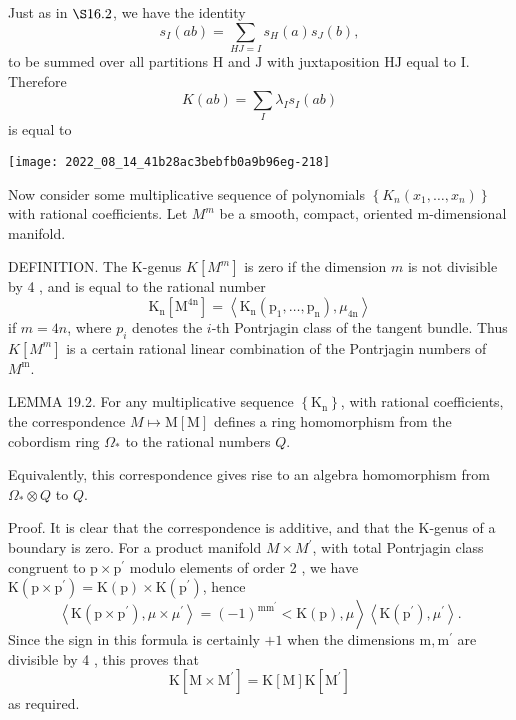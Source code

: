 \documentclass[10pt]{article}
\begin{document}
Just as in $\S 16.2$, we have the identity
$$
s_{I}(a b)=\sum_{H J=I} s_{H}(a) s_{J}(b),
$$
to be summed over all partitions $\mathrm{H}$ and $\mathrm{J}$ with juxtaposition $\mathrm{HJ}$ equal to I. Therefore
$$
K(a b)=\sum_{I} \lambda_{I} s_{I}(a b)
$$
is equal to

\texttt{[image: 2022\_08\_14\_41b28ac3bebfb0a9b96eg-218]}

Now consider some multiplicative sequence of polynomials $\left\{K_{n}\left(x_{1}, \ldots, x_{n}\right)\right\}$ with rational coefficients. Let $M^{m}$ be a smooth, compact, oriented m-dimensional manifold.

DEFINITION. The K-genus $K\left[M^{m}\right]$ is zero if the dimension $m$ is not divisible by 4 , and is equal to the rational number
$$
\mathrm{K}_{\mathrm{n}}\left[\mathrm{M}^{4 \mathrm{n}}\right]=\left\langle\mathrm{K}_{\mathrm{n}}\left(\mathrm{p}_{1}, \ldots, \mathrm{p}_{\mathrm{n}}\right), \mu_{4 \mathrm{n}}\right\rangle
$$
if $m=4 n$, where $p_{i}$ denotes the $i$-th Pontrjagin class of the tangent bundle. Thus $K\left[M^{m}\right]$ is a certain rational linear combination of the Pontrjagin numbers of $M^{\mathrm{m}}$.

LEMMA 19.2. For any multiplicative sequence $\left\{\mathrm{K}_{\mathrm{n}}\right\}$, with rational coefficients, the correspondence $M \mapsto \mathrm{M}[\mathrm{M}]$ defines a ring homomorphism from the cobordism ring $\Omega_{*}$ to the rational numbers $Q .$

Equivalently, this correspondence gives rise to an algebra homomorphism from $\Omega_{*} \otimes Q$ to $Q$.

Proof. It is clear that the correspondence is additive, and that the $\mathrm{K}$-genus of a boundary is zero. For a product manifold $M \times M^{\prime}$, with total Pontrjagin class congruent to $\mathrm{p} \times \mathrm{p}^{\prime}$ modulo elements of order 2 , we have $\mathrm{K}\left(\mathrm{p} \times \mathrm{p}^{\prime}\right)=\mathrm{K}(\mathrm{p}) \times \mathrm{K}\left(\mathrm{p}^{\prime}\right)$, hence
$$
\left.\left\langle\mathrm{K}\left(\mathrm{p} \times \mathrm{p}^{\prime}\right), \mu \times \mu^{\prime}\right\rangle=(-1)^{\mathrm{mm}^{\prime}}<\mathrm{K}(\mathrm{p}), \mu\right\rangle\left\langle\mathrm{K}\left(\mathrm{p}^{\prime}\right), \mu^{\prime}\right\rangle .
$$
Since the sign in this formula is certainly $+1$ when the dimensions $\mathrm{m}, \mathrm{m}^{\prime}$ are divisible by 4 , this proves that
$$
\mathrm{K}\left[\mathrm{M} \times \mathrm{M}^{\prime}\right]=\mathrm{K}[\mathrm{M}] \mathrm{K}\left[\mathrm{M}^{\prime}\right]
$$
as required.
\end{document}
